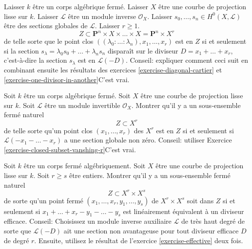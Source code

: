 \begin{exercise}
\label{exercise-closed-subset-vanshing-r}
Laisser $k$ être un corps algébrique fermé. Laisser $X$ être une
courbe de projection lisse sur $k$. Laisser $\mathcal{L}$ être un
module inverse $\mathcal{O}_X$. Laisser $s_0, \ldots, s_n
\in H^0(X, \mathcal{L})$ être des sections globales
de $\mathcal{L}$. Laisser $r \geq 1$.
$$
Z \subset
\mathbf{P}^n \times X \times \ldots \times X = \mathbf{P}^n \times X^r
$$
de telle sorte que
le point clos $((\lambda_0 : \ldots : \lambda_n), x_1,
\ldots, x_r)$ est en $Z$ si
et seulement si la section $s_\lambda = \lambda_0
s_0 + \ldots + \lambda_n s_n$ disparaît sur le
diviseur $D = x_1 + \ldots + x_r$,
c'est-à-dire la section $s_\lambda$ est en $\mathcal{L}(-D)$. Conseil: expliquer comment
ceci suit en combinant ensuite les résultats
des exercices \ref{exercise-diagonal-cartier} et \ref{exercise-one-divisor-in-another}C'est vrai.
\end{exercise}

\begin{exercise}
\label{exercise-effective}
Soit $k$ être un corps algébrique fermé. Soit $X$ être une courbe de
projection lisse sur $k$. Soit $\mathcal{L}$ être un module invertible $\mathcal{O}_X$. Montrer
qu'il y a un sous-ensemble fermé naturel
$$
Z \subset X^r
$$
de telle sorte qu'un point clos $(x_1, \ldots, x_r)$ des $X^r$
est en $Z$ si et seulement si $\mathcal{L}(-x_1 - \ldots
-x_r)$ a une section globale non zéro. Conseil: utiliser Exercice \ref{exercise-closed-subset-vanshing-r}C'est vrai.
\end{exercise}

\begin{exercise}
\label{exercise-difference-effective}
Soit $k$ être un corps fermé algébriquement. Soit $X$ être une courbe de projection lisse
sur $k$. Soit $r \geq s$ être entiers. Montrer qu'il y a un sous-ensemble fermé
naturel
$$
Z \subset X^r \times X^s
$$
de sorte qu'un point fermé $(x_1, \ldots, x_r, y_1, \ldots, y_s)$ de
$X^r \times X^s$ soit
dans $Z$ si et seulement si $x_1 + \ldots + x_r
- y_1 - \ldots - y_s$ est linéairement
équivalent à un diviseur efficace. Conseil: Choisissez un module inverse
auxiliaire $\mathcal{L}$ de très haut degré de sorte que $\mathcal{L}(-D)$ ait
une section non avantageuse pour tout diviseur efficace $D$ de
degré $r$. Ensuite, utilisez le résultat de l'exercice \ref{exercise-effective} deux fois.
\end{exercise}

